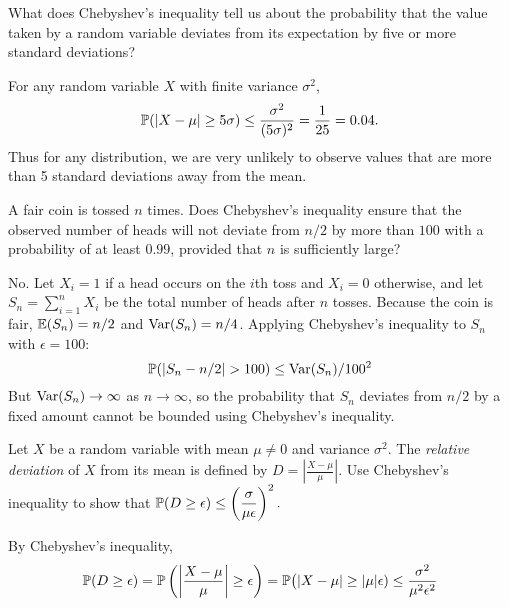 \begin{exercise}
\begin{questions}

\question
What does Chebyshev's inequality tell us about the probability that the value taken by a random variable deviates from its expectation by five or more standard deviations?
\begin{answer}
For any random variable $X$ with finite variance $\sigma^2$,
\[
\mathbb{P}(|X-\mu|\geq 5\sigma) \leq \frac{\sigma^2}{(5\sigma)^2} = \frac{1}{25} = 0.04.
\]
Thus for any distribution, we are very unlikely to observe values that are more than 5 standard deviations away from the mean.
\end{answer}

\question
A fair coin is tossed $n$ times. Does Chebyshev's inequality ensure that the observed number of heads will not deviate from $n/2$ by more than $100$ with a probability of at least $0.99$, provided that $n$ is sufficiently large?
\begin{answer}
No. Let $X_i=1$ if a head occurs on the $i$th toss and $X_i=0$ otherwise, and let $S_n = \sum_{i=1}^n X_i$ be the total number of heads after $n$ tosses. Because the coin is fair, $\mathbb{E}(S_n)=n/2$ and $\text{Var}(S_n)=n/4$. Applying Chebyshev's inequality to $S_n$ with $\epsilon=100$:
\[
\mathbb{P}(|S_n - n/2| > 100) \leq \text{Var}(S_n)/100^2
\]
But $\text{Var}(S_n)\to\infty$ as $n\to\infty$, so the probability that $S_n$ deviates from $n/2$ by a fixed amount cannot be bounded using Chebyshev's inequality.
\end{answer}


\question
Let $X$ be a random variable with mean $\mu\neq 0$ and variance $\sigma^2$. The \emph{relative deviation} of $X$ from its mean is defined by $\displaystyle D  = \left|\frac{X-\mu}{\mu}\right|$. Use Chebyshev's inequality to show that 
$
\displaystyle \mathbb{P}(D \geq \epsilon) \leq \left(\frac{\sigma}{\mu\epsilon}\right)^2.
$
\begin{answer} 
By Chebyshev's inequality,
\[
\mathbb{P}(D\geq \epsilon) 
	= \mathbb{P}\left(\left|\frac{X-\mu}{\mu}\right|\geq \epsilon\right)
	= \mathbb{P}\big(|X-\mu|\geq |\mu|\epsilon)
	\leq \frac{\sigma^2}{\mu^2 \epsilon^2}
\]
\end{answer}

\question
{}
\end{questions}
\end{exercise}
